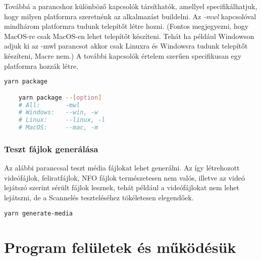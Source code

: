 Továbbá a parancshoz különböző kapcsolók társíthatók, amellyel specifikálhatjuk, hogy milyen platformra szeretnénk az alkalmazást buildelni. Az {\it -mwl} kapcsolóval mindhárom platformra tudunk telepítőt létre hozni. (Fontos megjegyezni, hogy MacOS-re csak MacOS-en lehet telepítőt készíteni. Tehát ha például Windowson adjuk ki az -mwl parancsot akkor csak Linuxra és Windowsra tudunk telepítőt készíteni, Macre nem.) A további kapcsolók értelem szerűen specifikusan egy platformra hozzák létre.
\begin{lstlisting}[language={Bash}, numbers={none}]
    yarn package

    yarn package --[option]
    # All:       -mwl
    # Windows:   --win, -w
    # Linux:     --linux, -l
    # MacOS:     --mac, -m
\end{lstlisting}

\subsubsection{Teszt fájlok generálása}
Az alábbi paranccsal teszt média fájlokat lehet generálni. Az így létrehozott videófájlok, feliratfájlok, NFO fájlok természetesen nem valós, illetve az videó lejátszó szerint sérült fájlok lesznek, tehát például a videófájlokat nem lehet lejátszni, de a Scannelés teszteléséhez tökéletesen elegendőek.
\begin{lstlisting}[language={Bash}, numbers={none}]
    yarn generate-media
\end{lstlisting}

\section{Program felületek és működésük}

